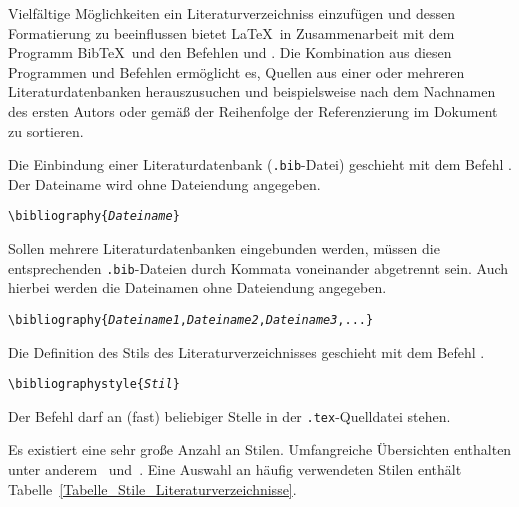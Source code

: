 Vielfältige Möglichkeiten ein Literaturverzeichniss einzufügen und dessen Formatierung zu beeinflussen bietet \LaTeX\ in Zusammenarbeit mit dem Programm Bib\TeX\ und den Befehlen \verb|| und \verb||. Die Kombination aus diesen Programmen und Befehlen ermöglicht es, Quellen aus einer oder mehreren Literaturdatenbanken herauszusuchen und beispielsweise nach dem Nachnamen des ersten Autors oder gemäß der Reihenfolge der Referenzierung im Dokument zu sortieren. 

Die Einbindung einer Literaturdatenbank (\verb|.bib|-Datei) geschieht mit dem Befehl \verb||. Der Dateiname wird ohne Dateiendung angegeben.

\begin{boxedminipage}{\textwidth}
	\texttt{\textbackslash bibliography\{\textsl{Dateiname}\}} 
\end{boxedminipage}

Sollen mehrere Literaturdatenbanken eingebunden werden, müssen die entsprechenden \verb|.bib|-Dateien durch Kommata voneinander abgetrennt sein. Auch hierbei werden die Dateinamen ohne Dateiendung angegeben.

\begin{boxedminipage}{\textwidth}
	\texttt{\textbackslash bibliography\{\textsl{Dateiname1},\textsl{Dateiname2},\textsl{Dateiname3},...\}} 
\end{boxedminipage}

Die Definition des Stils des Literaturverzeichnisses geschieht mit dem Befehl \verb||.

\begin{boxedminipage}{\textwidth}
	\texttt{\textbackslash bibliographystyle\{\textsl{Stil}\}} 
\end{boxedminipage}

Der Befehl darf an (fast) beliebiger Stelle in der \verb!.tex!-Quelldatei stehen.

Es existiert eine sehr große Anzahl an Stilen. Umfangreiche Übersichten enthalten unter anderem~\cite{voss2007referenz} und~\cite{BibtexStylesShareLaTeXWebseite}. Eine Auswahl an häufig verwendeten Stilen enthält Tabelle~\ref{Tabelle_Stile_Literaturverzeichnisse}. 


